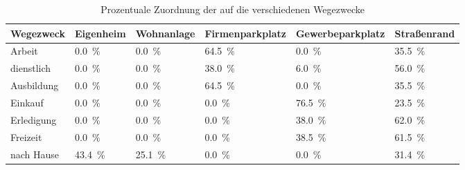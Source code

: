 {
\renewcommand{\arraystretch}{1.2}%
\begin{table}[H]
	\begin{center}
		\caption{Prozentuale Zuordnung der \UCs auf die verschiedenen Wegezwecke}
		\begin{tabu} to \textwidth {X[1.2] X[1.1, r] X[1.3, r] X[1.7, r] X[1.8, r] X[1.2, r]}
            \hline
            Wegezweck  & Eigenheim           & Wohnanlage          & Firmenparkplatz     & Gewerbeparkplatz   & Straßenrand         \\ \hline
            Arbeit     & \SI{0.0}{\percent}  & \SI{0.0}{\percent}  & \SI{64.5}{\percent} & \SI{0.0}{\percent}  & \SI{35.5}{\percent} \\
            dienstlich & \SI{0.0}{\percent}  & \SI{0.0}{\percent}  & \SI{38.0}{\percent} & \SI{6.0}{\percent}  & \SI{56.0}{\percent} \\
            Ausbildung & \SI{0.0}{\percent}  & \SI{0.0}{\percent}  & \SI{64.5}{\percent} & \SI{0.0}{\percent}  & \SI{35.5}{\percent} \\
            Einkauf    & \SI{0.0}{\percent}  & \SI{0.0}{\percent}  & \SI{0.0}{\percent}  & \SI{76.5}{\percent} & \SI{23.5}{\percent} \\
            Erledigung & \SI{0.0}{\percent}  & \SI{0.0}{\percent}  & \SI{0.0}{\percent}  & \SI{38.0}{\percent} & \SI{62.0}{\percent} \\
            Freizeit   & \SI{0.0}{\percent}  & \SI{0.0}{\percent}  & \SI{0.0}{\percent}  & \SI{38.5}{\percent} & \SI{61.5}{\percent} \\
            nach Hause & \SI{43.4}{\percent} & \SI{25.1}{\percent} & \SI{0.0}{\percent}  & \SI{0.0}{\percent}  & \SI{31.4}{\percent} \\ \hline
		\end{tabu}
		\label{tab:WegLadeUseCase}
	\end{center}
	\vspace{-3mm}%
\end{table}
}